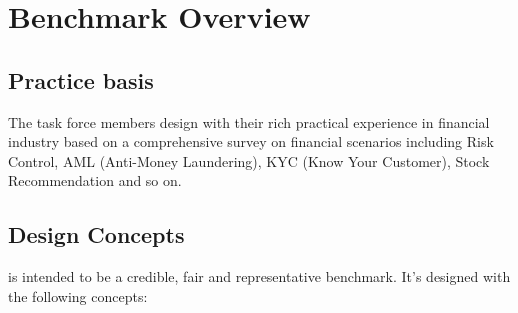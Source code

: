 \chapter{Benchmark Overview}
\label{sec:benchmark-overview}

\section{Practice basis}

The task force members design \ldbcfinbench with their rich practical experience in
financial industry based on a comprehensive survey on financial scenarios including
Risk Control, AML (Anti-Money Laundering), KYC (Know Your Customer), Stock Recommendation
and so on.


\section{Design Concepts}

\ldbcfinbench is intended to be a credible, fair and representative benchmark.
It's designed with the following concepts:

